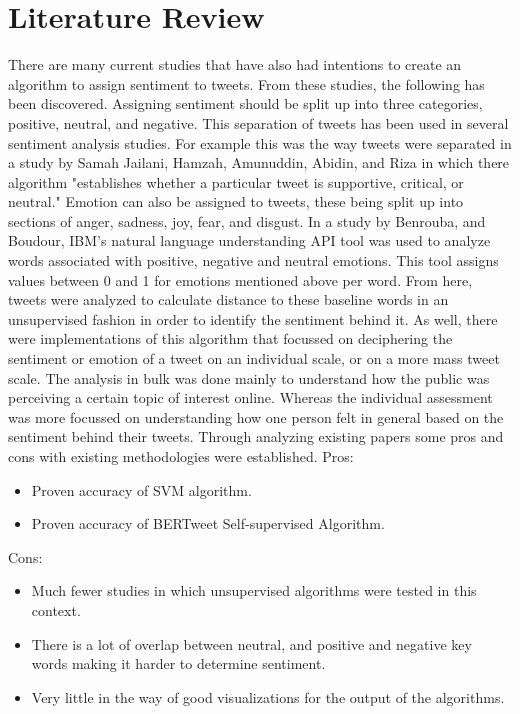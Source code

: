 \documentclass[conference]{IEEEtran}
\begin{document}
\section{Literature Review}
There are many current studies that have also had intentions to create an algorithm to assign sentiment to tweets.  
From these studies, the following has been discovered.
Assigning sentiment should be split up into three categories, positive, neutral, and negative.
This separation of tweets has been used in several sentiment analysis studies.
For example this was the way tweets were separated in a study by Samah Jailani, Hamzah, Amunuddin, Abidin, and Riza in which there algorithm "establishes whether a particular tweet is supportive, critical, or neutral\cite{b2}."
Emotion can also be assigned to tweets, these being split up into sections of anger, sadness, joy, fear, and disgust. 
In a study by Benrouba, and Boudour, IBM's natural language understanding API tool was used to analyze words associated with positive, negative and neutral emotions\cite{b1}.
This tool assigns values between 0 and 1 for emotions mentioned above per word. 
From here, tweets were analyzed to calculate distance to these baseline words in an unsupervised fashion in order to identify the sentiment behind it. 
As well, there were implementations of this algorithm that focussed on deciphering the sentiment or emotion of a tweet on an individual scale, or on a more mass tweet scale.
The analysis in bulk was done mainly to understand how the public was perceiving a certain topic of interest online. 
Whereas the individual assessment was more focussed on understanding how one person felt in general based on the sentiment behind their tweets. 
Through analyzing existing papers some pros and cons with existing methodologies were established. \newline
\newline
Pros: 
\begin{itemize}
    \item Proven accuracy of SVM algorithm.
    \item Proven accuracy of BERTweet Self-supervised Algorithm.
\end{itemize}
Cons:
\begin{itemize}
    \item Much fewer studies in which unsupervised algorithms were tested in this context.
    \item There is a lot of overlap between neutral, and positive and negative key words making it harder to determine sentiment.
    \item Very little in the way of good visualizations for the output of the algorithms.
\end{itemize}
\end{document}
